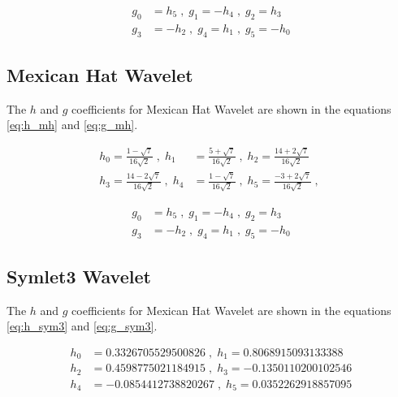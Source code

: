 \documentclass[12pt]{article}
\begin{document}
	\begin{equation}
		\begin{aligned}
		g_0 &= h_5 \;,\; g_1 = -h_4 \;,\; g_2 = h_3 \\
		g_3 &= -h_2 \;,\; g_4 = h_1 \;,\; g_5 = -h_0
		\end{aligned}
		\label{eq:g_db6}
	\end{equation}
	
	\subsection{Mexican Hat Wavelet}
	The  $h$ and $g$ coefficients for Mexican Hat Wavelet are shown in the equations \ref{eq:h_mh} and \ref{eq:g_mh}.
	
	\begin{equation}
		\begin{aligned}
			h_0 = \frac{1-\sqrt7}{16\sqrt2} \;,\; h_1 &= \frac{5+\sqrt7}{16\sqrt2} \;,\; h_2 = \frac{14+2\sqrt7}{16\sqrt2} \\
			h_3 = \frac{14-2\sqrt7}{16\sqrt2} \;,\; h_4 &= \frac{1-\sqrt7}{16\sqrt2} \;,\; h_5 = \frac{-3+2\sqrt7}{16\sqrt2} \;,\;
		\end{aligned}
		\label{eq:h_mh}
	\end{equation}
	
	\begin{equation}
		\begin{aligned}
			g_0 &= h_5 \;,\; g_1 = -h_4 \;,\; g_2 = h_3 \\
			g_3 &= -h_2 \;,\; g_4 = h_1 \;,\; g_5 = -h_0
		\end{aligned}
		\label{eq:g_mh}
	\end{equation}
	
	\subsection{Symlet3 Wavelet}
	
	The  $h$ and $g$ coefficients for Mexican Hat Wavelet are shown in the equations \ref{eq:h_sym3} and \ref{eq:g_sym3}.
	
	\begin{equation}
		\begin{aligned}
			h_0 &= 0.3326705529500826 \;,\; h_1 = 0.8068915093133388 \\
			h_2 &= 0.4598775021184915 \;,\; h_3 = -0.1350110200102546 \\
			h_4 &= -0.0854412738820267 \;,\; h_5 = 0.0352262918857095
		\end{aligned}
		\label{eq:h_sym3}
	\end{equation}
	
\end{document}
